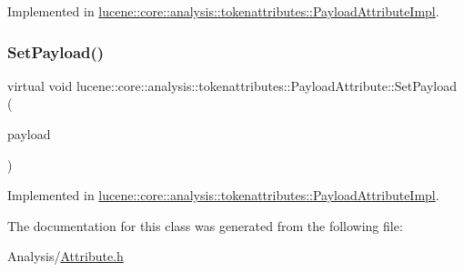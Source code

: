 Implemented in \mbox{\hyperlink{classlucene_1_1core_1_1analysis_1_1tokenattributes_1_1PayloadAttributeImpl_a60adf0536ed3492e2cbfc2f59846ff8d}{lucene\+::core\+::analysis\+::tokenattributes\+::\+Payload\+Attribute\+Impl}}.

\mbox{\label{classlucene_1_1core_1_1analysis_1_1tokenattributes_1_1PayloadAttribute_a52bb5ae9332ad24a12be66374e1f1bcb}} 
\subsubsection{\texorpdfstring{Set\+Payload()}{SetPayload()}}
{\footnotesize\ttfamily virtual void lucene\+::core\+::analysis\+::tokenattributes\+::\+Payload\+Attribute\+::\+Set\+Payload (\begin{DoxyParamCaption}\item[{\mbox{\hyperlink{classlucene_1_1core_1_1util_1_1BytesRef}{lucene\+::core\+::util\+::\+Bytes\+Ref}} \&}]{payload }\end{DoxyParamCaption})\hspace{0.3cm}{\ttfamily [pure virtual]}}



Implemented in \mbox{\hyperlink{classlucene_1_1core_1_1analysis_1_1tokenattributes_1_1PayloadAttributeImpl_a69b9a7d6938f53e84dff76d6a0e9c2f3}{lucene\+::core\+::analysis\+::tokenattributes\+::\+Payload\+Attribute\+Impl}}.



The documentation for this class was generated from the following file\+:\begin{DoxyCompactItemize}
\item 
Analysis/\mbox{\hyperlink{Analysis_2Attribute_8h}{Attribute.\+h}}\end{DoxyCompactItemize}
